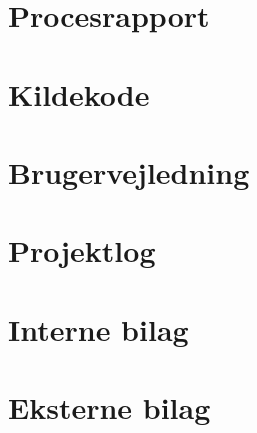 \documentclass[12pt]{report}
\begin{document}
\chapter{Procesrapport}



\chapter{Kildekode}




\chapter{Brugervejledning}



\chapter{Projektlog}

\newpage

\chapter{Interne bilag}



\chapter{Eksterne bilag}

\end{document}
